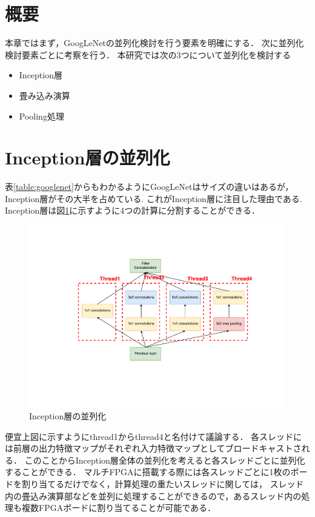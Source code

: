 {
\label{chap:parallel}

\section{概要}
本章ではまず，GoogLeNetの並列化検討を行う要素を明確にする．
次に並列化検討要素ごとに考察を行う．
本研究では次の3つについて並列化を検討する
\begin{itemize}
   \item Inception層 
   \item 畳み込み演算 
   \item Pooling処理 
\end{itemize}
\section{Inception層の並列化}
\label{sec:inception_para}
表\ref{table:googlenet}からもわかるようにGoogLeNetはサイズの違いはあるが，Inception層がその大半を占めている.
これがInception層に注目した理由である.
Inception層は図\ref{fig:para_inception}に示すように4つの計算に分割することができる．
\begin{figure}[h]
  \centering
  \includegraphics[width=12cm]{./chap5/fig/para_inception.pdf}
  \caption{Inception層の並列化}
  \label{fig:para_inception}
\end{figure}
便宜上図に示すようにthread1からthread4と名付けて議論する．
各スレッドには前層の出力特徴マップがそれぞれ入力特徴マップとしてブロードキャストされる．
このことからInception層全体の並列化を考えると各スレッドごとに並列化することができる．
マルチFPGAに搭載する際には各スレッドごとに1枚のボードを割り当てるだけでなく，計算処理の重たいスレッドに関しては，
スレッド内の畳込み演算部などを並列に処理することができるので，あるスレッド内の処理も複数FPGAボードに割り当てることが可能である．

}
